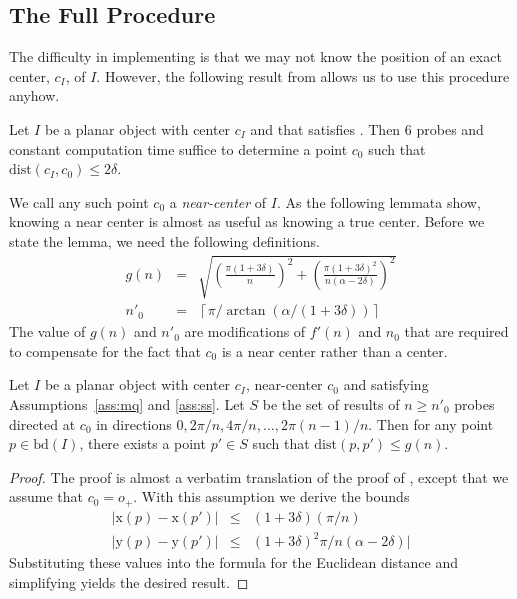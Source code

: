 \documentclass[11pt]{article}
\newcommand{\origin}{o_+}
\newcommand{\bd}{\mathrm{bd}}
\newcommand{\dist}{\mathrm{dist}}
\newcommand{\x}{\mathrm{x}}
\newcommand{\y}{\mathrm{y}}
\newcommand{\fpn}{\sqrt{\left(\frac{\pi(1+3\delta)}{n}\right)^2 +
	\left(\frac{\pi(1+3\delta)^2}{n(\alpha-2\delta)}\right)^2}}
\newcommand{\npo}{\left\lceil\pi/\arctan(\alpha/(1+3\delta))\right\rceil}
\begin{document}
\subsection{The Full Procedure}

The difficulty in implementing  is that we may
not know the position of an exact center, $c_I$, of $I$.  However,
the following result from \cite{msy97,sy95} allows us to use this procedure
anyhow.

\begin{thm}
Let $I$ be a planar object with center $c_I$ and that satisfies
.  Then 6 probes and constant computation time suffice to
determine a point $c_0$ such that $\dist(c_I,c_0)\le 2\delta$.
\end{thm}

We call any such point $c_0$ a \emph{near-center} of $I$.  As the
following lemmata show, knowing a near center is almost as useful as
knowing a true center.  Before we state the lemma, we need the
following definitions.
\begin{eqnarray}
g(n) & = & \fpn \\
n'_0 & = & \npo
\end{eqnarray}
The value of $g(n)$ and $n'_0$ are modifications of $f'(n)$ and $n_0$
that are required to compensate for the fact that $c_0$ is a near
center rather than a center.


\begin{lem}
Let $I$ be a planar object with center $c_I$, near-center $c_0$ and
satisfying Assumptions~\ref{ass:mq} and \ref{ass:ss}.  Let $S$ be the
set of results of $n\ge n'_0$ probes directed at $c_0$ in directions
$0,2\pi/n,4\pi/n,\ldots,2\pi(n-1)/n$.  Then for any point
$p\in\bd(I)$, there exists a point $p'\in S$ such that $\dist(p,p')\le
g(n)$.
\end{lem}

\begin{proof}
The proof is almost a verbatim translation of the proof of
, except that we assume that $c_0=\origin$.  With
this assumption we derive the bounds
\begin{eqnarray}
|\x(p)-\x(p')| & \le & (1+3\delta)(\pi/n) \\
|\y(p)-\y(p')| & \le & (1+3\delta)^2\pi/n(\alpha-2\delta)|
\end{eqnarray}
Substituting these values into the formula for the Euclidean distance
and simplifying yields the desired result. 
\end{proof}
\end{document}
